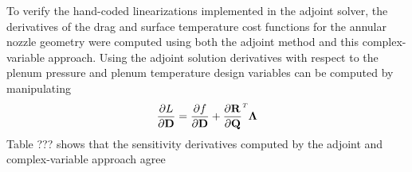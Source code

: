 To verify the hand-coded linearizations implemented in the adjoint solver, the
derivatives of the drag and surface temperature cost functions for the
annular nozzle geometry were computed using both the adjoint method and this
complex-variable approach. Using the adjoint solution derivatives with respect
to the plenum pressure and plenum temperature design variables can be computed
by manipulating 
\begin{equation}
  \pd{L}{\md} = \pd{f}{\md} + \rtdiff{}{\mq} \mathbf{\Lambda}
  \label{obj-linearization}
\end{equation}
Table ??? shows that the sensitivity derivatives computed by the adjoint and
complex-variable approach agree

